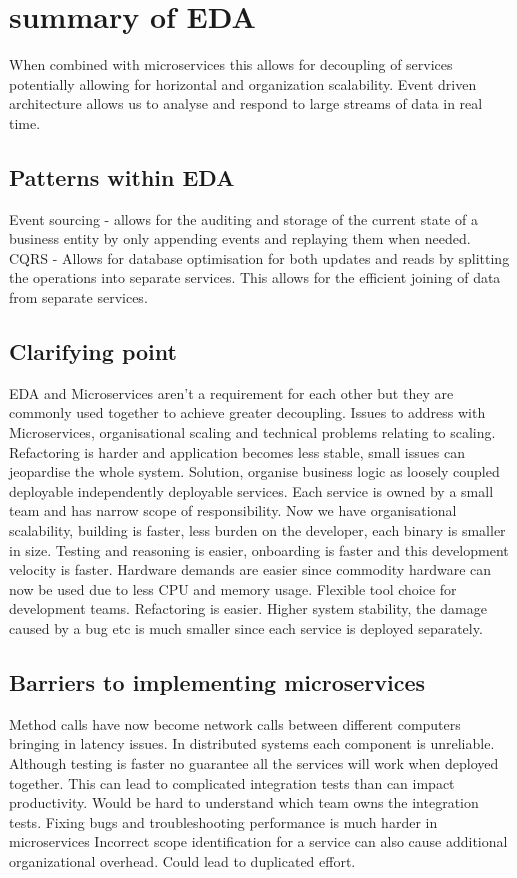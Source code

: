 \section{summary of EDA}
When combined with microservices this allows for decoupling of services potentially allowing for horizontal and organization scalability.
Event driven architecture allows us to analyse and respond to large streams of data in real time.

\subsection{Patterns within EDA}
Event sourcing - allows for the auditing and storage of the current state of a business entity by only appending events and replaying them when needed.
CQRS - Allows for database optimisation for both updates and reads by splitting the operations into separate services.
This allows for the efficient joining of data from separate services.

\subsection{Clarifying point} EDA and Microservices aren't a requirement for each other but they are commonly used together to achieve greater decoupling.
Issues to address with Microservices, organisational scaling and technical problems relating to scaling.
Refactoring is harder and application becomes less stable, small issues can jeopardise the whole system.
Solution, organise business logic as loosely coupled deployable independently deployable services.
Each service is owned by a small team and has narrow scope of responsibility.
Now we have organisational scalability, building is faster, less burden on the developer, each binary is smaller in size.
Testing and reasoning is easier, onboarding is faster and this development velocity is faster.
Hardware demands are easier since commodity hardware can now be used due to less CPU and memory usage.
Flexible tool choice for development teams.
Refactoring is easier.
Higher system stability, the damage caused by a bug etc is much smaller since each service is deployed separately.

\subsection{Barriers to implementing microservices}
Method calls have now become network calls between different computers bringing in latency issues.
In distributed systems each component is unreliable.
Although testing is faster no guarantee all the services will work when deployed together.
This can lead to complicated integration tests than can impact productivity.
Would be hard to understand which team owns the integration tests.
Fixing bugs and troubleshooting performance is much harder in microservices
Incorrect scope identification for a service can also cause additional organizational overhead.
Could lead to duplicated effort.